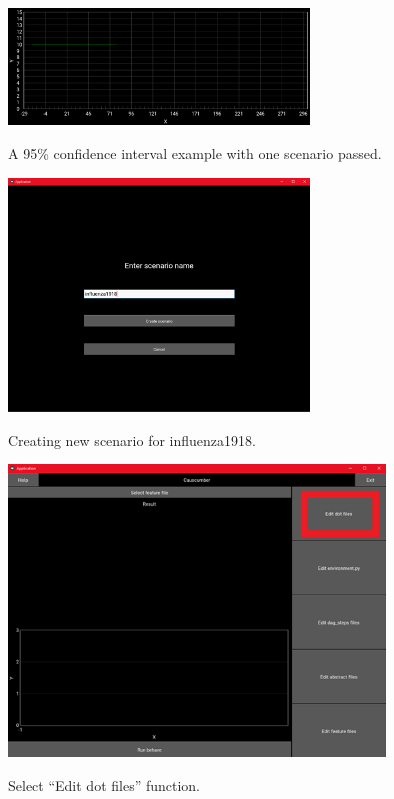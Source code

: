 \begin{figure}[H]
	\centering
	\includegraphics[width=8cm]{figures/95confidence_interval.png}\\
	\caption{A 95\% confidence interval example with one scenario passed.}
	\label{fig:figure40}
\end{figure}
\begin{figure}[H]
	\centering
	\includegraphics[width=8cm]{figures/influenzaTestProcess1.png}\\
	\caption{Creating new scenario for influenza1918.}
	\label{fig:figure19}
\end{figure}
\begin{figure}[H]
	\centering
	\includegraphics[width=10cm]{figures/influenzaTestProcess2.png}\\
	\caption{Select “Edit dot files” function.}
	\label{fig:figure20}
\end{figure}
